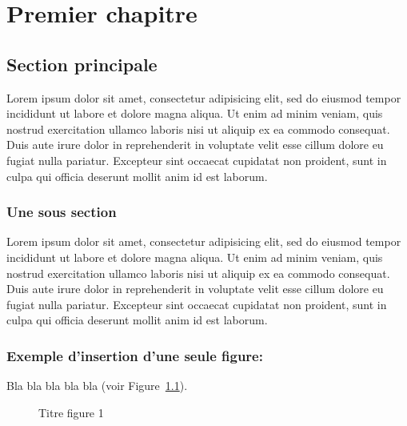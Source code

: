 \chapter{Premier chapitre}

\section{Section principale}
Lorem ipsum dolor sit amet, consectetur adipisicing elit, sed do eiusmod
tempor incididunt ut labore et dolore magna aliqua. Ut enim ad minim veniam,
quis nostrud exercitation ullamco laboris nisi ut aliquip ex ea commodo
consequat. Duis aute irure dolor in reprehenderit in voluptate velit esse
cillum dolore eu fugiat nulla pariatur. Excepteur sint occaecat cupidatat non
proident, sunt in culpa qui officia deserunt mollit anim id est laborum.

\subsection{Une sous section}
Lorem ipsum dolor sit amet, consectetur adipisicing elit, sed do eiusmod
tempor incididunt ut labore et dolore magna aliqua. Ut enim ad minim veniam,
quis nostrud exercitation ullamco laboris nisi ut aliquip ex ea commodo
consequat. Duis aute irure dolor in reprehenderit in voluptate velit esse
cillum dolore eu fugiat nulla pariatur. Excepteur sint occaecat cupidatat non
proident, sunt in culpa qui officia deserunt mollit anim id est laborum.

\subsection{Exemple d'insertion d'une seule figure:}

Bla bla bla bla bla (voir Figure~\ref{fig:Allmagne}).

 \begin{figure} [h!]%
 	\vspace*{13pt}
 	\vspace*{13pt}               
 	\caption{Titre figure 1} 
 	\label{fig:Allmagne}
 \end{figure} 


